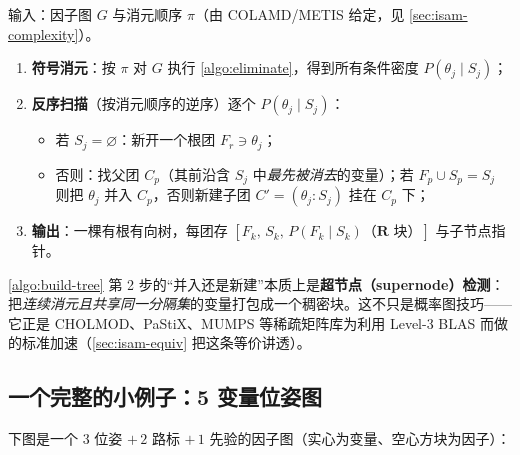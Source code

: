 \begin{algo}
\label{algo:build-tree}
输入：因子图 $G$ 与消元顺序 $\pi$（由 COLAMD/METIS 给定，见 \cref{sec:isam-complexity}）。
\begin{enumerate}
  \item \textbf{符号消元}：按 $\pi$ 对 $G$ 执行 \cref{algo:eliminate}，得到所有条件密度 $P(\theta_j\mid S_j)$；
  \item \textbf{反序扫描}（按消元顺序的逆序）逐个 $P(\theta_j\mid S_j)$：
  \begin{itemize}
    \item 若 $S_j=\varnothing$：新开一个根团 $F_r\ni\theta_j$；
    \item 否则：找父团 $C_p$（其前沿含 $S_j$ 中\emph{最先被消去}的变量）；若 $F_p\cup S_p=S_j$ 则把 $\theta_j$ 并入 $C_p$，否则新建子团 $C'=(\theta_j:S_j)$ 挂在 $C_p$ 下；
  \end{itemize}
  \item \textbf{输出}：一棵有根有向树，每团存 $[F_k,\,S_k,\,P(F_k\mid S_k)\text{（}\mathbf{R}\text{ 块）}]$ 与子节点指针。
\end{enumerate}
\end{algo}

\begin{insight}[Bayes 树构造 $=$ 超节点检测]
\cref{algo:build-tree} 第 2 步的“并入还是新建”本质上是\textbf{超节点（supernode）检测}：把\emph{连续消元且共享同一分隔集}的变量打包成一个稠密块。这不只是概率图技巧——它正是 CHOLMOD、PaStiX、MUMPS 等稀疏矩阵库为利用 Level-3 BLAS 而做的标准加速（\cref{sec:isam-equiv} 把这条等价讲透）。
\end{insight}

\subsection{一个完整的小例子：5 变量位姿图}
\label{sec:isam-example5}

下图是一个 $3$ 位姿 $+\,2$ 路标 $+\,1$ 先验的因子图（实心为变量、空心方块为因子）：

